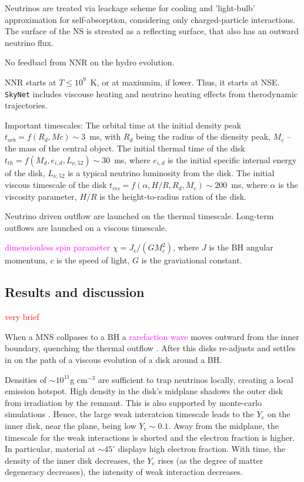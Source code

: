 \documentclass[11pt,a4paper,headinclude=true,DIV=14,BCOR=8mm,chapterprefix,listof=totoc,twoside,openright,abstracton]{scrbook}
\newcommand{\red}[1]{\textcolor{red}{#1}}
\newcommand{\magenta}[1]{\textcolor{magenta}{#1}} %
\begin{document}
Neutrinos are treated via leackage scheme for cooling and 'light-bulb' approximation for self-absorption, considering only charged-particle interactions. The surface of the NS is streated as a reflecting surface, that also has an outward neutrino flux.

No feedbacl from NNR on the hydro evolution. 

NNR starts at $T\leq 10^9$~K, or at maxiumim, if lower. Thus, it starts at NSE. \texttt{SkyNet} includes viscouse heating and neutrino heating effects from therodynamic trajectories. 

Important timescales:
The orbital time at the initial density peak $t_{orb}=f(R_d, Mc)\sim3$~ms, with $R_d$ being the radius of the diensity peak, $M_c$ -- the mass of the central object. 
The initial thermal time of the disk $t_{th}=f(M_d, e_{i,d}, L_{\nu,52})\sim30$~ms, where $e_{i,d}$ is the initial specific internal energy of the disk, $L_{\nu,52}$ is a typical neutrino luminosity from the disk.
The initial viscous timescale of the disk $t_{vis}=f(\alpha, H/R, R_d, M_c)\sim200$~ms, where
$\alpha$ is the viscosity parameter, $H/R$ is the height-to-radius ration of the disk.

Neutrino driven outflow are launched on the thermal timescale. Long-term outflows are launched on a viscous timescale. 

\magenta{dimensionless spin parameter} $\chi = J_c / (G M_c ^2)$, where $J$ is the BH angular momentum, $c$ is the speed of light, $G$ is the graviational constant. 


\subsection{Results and discussion}
\red{very brief}

When a MNS collpases to a BH a \magenta{rarefaction wave} moves outward from the inner boundary, quenching the thermal outflow \cite{(cf. Figure 3 of Metzger and Fernandez, 2014)}. After this disks re-adjusts and settles in on the path of a viscous evolution of a disk around a BH. 

Densities of $\sim 10^11$g cm$^{-3}$ are sufficient to trap neutrinos locally, creating a local emission hotspot. 
High density in the disk's midplane shadows the outer disk from irradiation by the remnant. This is also supported by monte-carlo simulations \cite{(Richers et al., 2015).}. Hence, the large weak interatcion timescale leads to the $Y_e$ on the inner disk, near the plane, being low $Y_e\sim0.1$. Away from the midplane, the timescale for the weak interactions is shorted and the electron fraction is higher. In particular, material at $\sim45^{\circ}$ displays high electron fraction.
With time, the density of the inner disk decreases, the $Y_e$ rises (as the degree of matter degeneracy decreases), the intensity of weak interaction decreases. 
\end{document}
